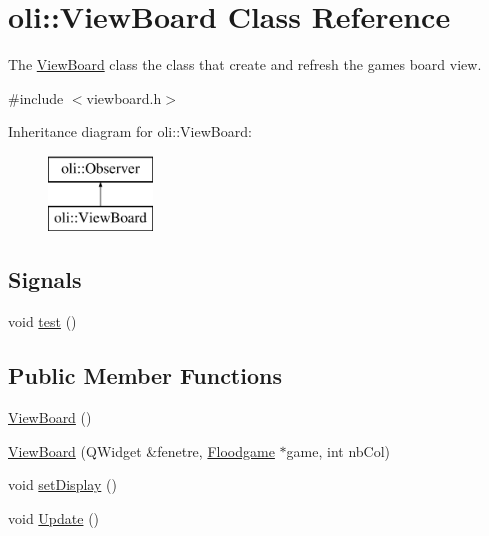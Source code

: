 \hypertarget{classoli_1_1_view_board}{}\section{oli\+:\+:View\+Board Class Reference}
\label{classoli_1_1_view_board}


The \hyperlink{classoli_1_1_view_board}{View\+Board} class the class that create and refresh the game\textquotesingle{}s board view.  




{\ttfamily \#include $<$viewboard.\+h$>$}

Inheritance diagram for oli\+:\+:View\+Board\+:\begin{figure}[H]
\begin{center}
\leavevmode
\includegraphics[height=2.000000cm]{classoli_1_1_view_board}
\end{center}
\end{figure}
\subsection*{Signals}
\begin{DoxyCompactItemize}
\item 
void \hyperlink{classoli_1_1_view_board_a6490954a9baf4e72e899ba10a4f414b7}{test} ()
\end{DoxyCompactItemize}
\subsection*{Public Member Functions}
\begin{DoxyCompactItemize}
\item 
\hyperlink{classoli_1_1_view_board_a36385a4f3f367326ad864c64e6dff4bc}{View\+Board} ()
\item 
\hyperlink{classoli_1_1_view_board_a0d4a844b1b5450ab623a747b7ced2e59}{View\+Board} (Q\+Widget \&fenetre, \hyperlink{classoli_1_1_floodgame}{Floodgame} $\ast$game, int nb\+Col)
\item 
void \hyperlink{classoli_1_1_view_board_a0f9e3b18dfb6f2224bef1b73ce8b3929}{set\+Display} ()
\item 
void \hyperlink{classoli_1_1_view_board_a487ea5886ec5de0422fc6e060aa7045b}{Update} ()
\end{DoxyCompactItemize}
